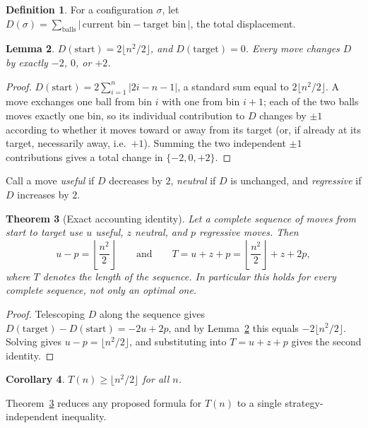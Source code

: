 \documentclass[11pt]{amsart}
\theoremstyle{plain}
\newtheorem{theorem}{Theorem}[section]
\newtheorem{lemma}[theorem]{Lemma}
\newtheorem{corollary}[theorem]{Corollary}
\theoremstyle{definition}
\newtheorem{definition}[theorem]{Definition}
\theoremstyle{remark}
\begin{document}
\begin{definition}
For a configuration $\sigma$, let $D(\sigma) = \sum_{\text{balls}} |\,\text{current bin} - \text{target bin}\,|$, the total displacement.
\end{definition}

\begin{lemma}
\label{lem:displacement}
$D(\text{start}) = 2\lfloor n^2/2\rfloor$, and $D(\text{target})=0$. Every move changes $D$ by exactly $-2$, $0$, or $+2$.
\end{lemma}

\begin{proof}
$D(\text{start}) = 2\sum_{i=1}^n |2i-n-1|$, a standard sum equal to $2\lfloor n^2/2\rfloor$. A move exchanges one ball from bin $i$ with one from bin $i+1$; each of the two balls moves exactly one bin, so its individual contribution to $D$ changes by $\pm 1$ according to whether it moves toward or away from its target (or, if already at its target, necessarily away, i.e.\ $+1$). Summing the two independent $\pm 1$ contributions gives a total change in $\{-2,0,+2\}$.
\end{proof}

Call a move \emph{useful} if $D$ decreases by $2$, \emph{neutral} if $D$ is unchanged, and \emph{regressive} if $D$ increases by $2$.

\begin{theorem}[Exact accounting identity]
\label{thm:accounting}
Let a complete sequence of moves from start to target use $u$ useful, $z$ neutral, and $p$ regressive moves. Then
\[
u - p = \left\lfloor \frac{n^2}{2}\right\rfloor \qquad\text{and}\qquad T = u+z+p = \left\lfloor\frac{n^2}{2}\right\rfloor + z + 2p,
\]
where $T$ denotes the length of the sequence. In particular this holds for \emph{every} complete sequence, not only an optimal one.
\end{theorem}

\begin{proof}
Telescoping $D$ along the sequence gives $D(\text{target})-D(\text{start}) = -2u+2p$, and by Lemma~\ref{lem:displacement} this equals $-2\lfloor n^2/2\rfloor$. Solving gives $u-p=\lfloor n^2/2\rfloor$, and substituting into $T=u+z+p$ gives the second identity.
\end{proof}

\begin{corollary}
\label{cor:baseline}
$T(n) \ge \lfloor n^2/2\rfloor$ for all $n$.
\end{corollary}

Theorem~\ref{thm:accounting} reduces any proposed formula for $T(n)$ to a single strategy-independent inequality.
\end{document}
